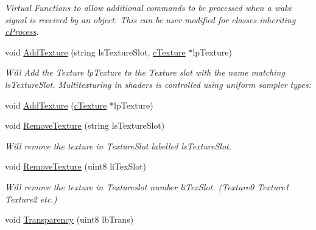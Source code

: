 \begin{DoxyCompactItemize}
\begin{DoxyCompactList}\small\item\em Virtual Functions to allow additional commands to be processed when a wake signal is received by an object. This can be user modified for classes inheriting \hyperlink{classc_process}{cProcess}. \end{DoxyCompactList}\item 
void \hyperlink{classc_render_object_ae6383e70912480e39209e5ed6297380c}{AddTexture} (string lsTextureSlot, \hyperlink{classc_texture}{cTexture} $\ast$lpTexture)
\begin{DoxyCompactList}\small\item\em Will Add the Texture lpTexture to the Texture slot with the name matching lsTextureSlot. Multitexturing in shaders is controlled using uniform sampler types: \end{DoxyCompactList}\item 
void \hyperlink{classc_render_object_ad45b379f57731d803f7a52e58d91d3aa}{AddTexture} (\hyperlink{classc_texture}{cTexture} $\ast$lpTexture)
\item 
\hypertarget{classc_render_object_a6e353a1713c4c6c46922a42e950f0d5a}{
void \hyperlink{classc_render_object_a6e353a1713c4c6c46922a42e950f0d5a}{RemoveTexture} (string lsTextureSlot)}
\label{classc_render_object_a6e353a1713c4c6c46922a42e950f0d5a}

\begin{DoxyCompactList}\small\item\em Will remove the texture in TextureSlot labelled lsTextureSlot. \end{DoxyCompactList}\item 
\hypertarget{classc_render_object_afd3f36d943e2438f52afb11133a526ca}{
void \hyperlink{classc_render_object_afd3f36d943e2438f52afb11133a526ca}{RemoveTexture} (uint8 liTexSlot)}
\label{classc_render_object_afd3f36d943e2438f52afb11133a526ca}

\begin{DoxyCompactList}\small\item\em Will remove the texture in Textureslot number liTexSlot. (Texture0 Texture1 Texture2 etc.) \end{DoxyCompactList}\item 
\hypertarget{classc_render_object_a67aaf98566003f0c60863aab06b874d4}{
void \hyperlink{classc_render_object_a67aaf98566003f0c60863aab06b874d4}{Transparency} (uint8 lbTrans)}
\label{classc_render_object_a67aaf98566003f0c60863aab06b874d4}


\end{DoxyCompactItemize}
